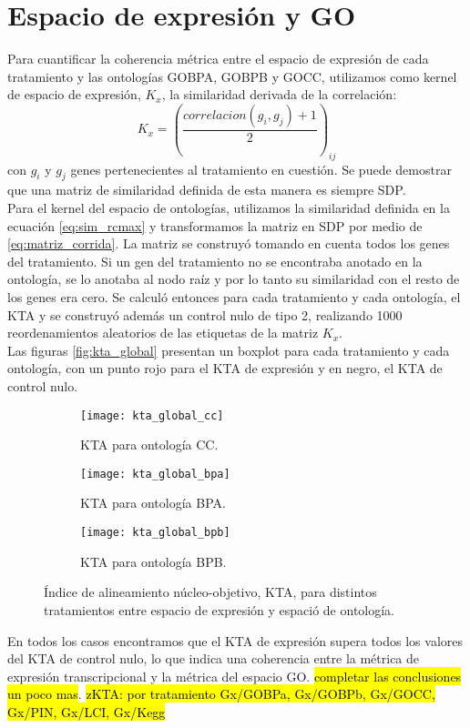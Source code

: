 \section{Espacio de expresión y GO}
Para cuantificar la coherencia métrica entre el espacio de expresión de cada tratamiento y las ontologías GOBPA, GOBPB y GOCC, utilizamos como kernel de espacio de expresión, $K_x$, la similaridad derivada de la correlación:
\begin{equation}
	K_x = (\frac{correlacion(g_i, g_j)+1}{2})_{ij}
\end{equation}
con $g_i$ y $g_j$ genes pertenecientes al tratamiento en cuestión. Se puede demostrar que una matriz de similaridad definida de esta manera es siempre SDP.\\
Para el kernel del espacio de ontologías, utilizamos la similaridad definida en la ecuación \ref{eq:sim_rcmax} y transformamos la matriz en SDP por medio de \ref{eq:matriz_corrida}. La matriz se construyó tomando en cuenta todos los genes del tratamiento. Si un gen del tratamiento no se encontraba anotado en la ontología, se lo anotaba al nodo raíz y por lo tanto su similaridad con el resto de los genes era cero. Se calculó entonces para cada tratamiento y cada ontología, el KTA y se construyó además un control nulo de tipo 2, realizando 1000 reordenamientos aleatorios de las etiquetas de la matriz $K_x$.\\
Las figuras \ref{fig:kta_global} presentan un boxplot para cada tratamiento y cada ontología, con un punto rojo para el KTA de expresión y en negro, el KTA de control nulo. 
\begin{figure*}[t!]
    \centering
    \begin{subfigure}[t]{0.5\textwidth}
    \centering
    \texttt{[image: kta\_global\_cc]}
    \caption{KTA para ontología CC.}
    \end{subfigure}
    \begin{subfigure}[t]{0.5\textwidth}
    \centering
    \texttt{[image: kta\_global\_bpa]}
    \caption{KTA para ontología BPA.}
    \end{subfigure}
    \begin{subfigure}[t]{0.5\textwidth}
    \centering
    \texttt{[image: kta\_global\_bpb]}
    \caption{KTA para ontología BPB.}
    \end{subfigure}    
    \caption{Índice de alineamiento núcleo-objetivo, KTA, para distintos tratamientos entre espacio de expresión y espació de ontología.}
    \label{kta_global}
\end{figure*}
En todos los casos encontramos que el KTA de expresión supera todos los valores del KTA de control nulo, lo que indica una coherencia entre la métrica de expresión transcripcional y la métrica del espacio GO. \hl{completar las conclusiones un poco mas}.
\hl{zKTA: por tratamiento Gx/GOBPa, Gx/GOBPb, Gx/GOCC, Gx/PIN, Gx/LCI, Gx/Kegg}